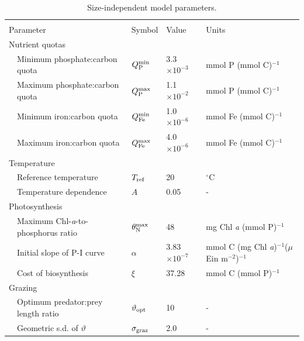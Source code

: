 \documentclass[gmd, manuscript]{copernicus}
\begin{document}
{\begin{table}[htp!]
\footnotesize
\caption{Size-independent model parameters.}
\begin{tabular*}{1.0\textwidth}{@{\extracolsep{\fill}}lllll}
\hline \\ [-2ex]
\multicolumn{2}{l}{{Parameter}} &{Symbol} & {Value} & {Units} \\ [+2ex]
\multicolumn{5}{l}{{Nutrient quotas}} \\ 
& Minimum phosphate:carbon quota & $Q^{\rm min}_{\rm P}$ & 3.3$\times10^{-3}$ & mmol P (mmol C)$^{-1}$ \\ 
& Maximum phosphate:carbon quota & $Q^{\rm max}_{\rm P}$ & 1.1$\times10^{-2}$ & mmol P (mmol C)$^{-1}$ \\ 
& Minimum iron:carbon quota & $Q^{\rm min}_{\rm Fe}$ & 1.0$\times10^{-6}$ & mmol Fe (mmol C)$^{-1}$ \\ 
& Maximum iron:carbon quota & $Q^{\rm max}_{\rm Fe}$ & 4.0$\times10^{-6}$ & mmol Fe (mmol C)$^{-1}$ \\ 
\multicolumn{5}{l}{{Temperature}} \\ 
& Reference temperature & $T_{\rm ref}$ & 20 & $^\circ$C \\ 
& Temperature dependence & $A$ & 0.05 & - \\ 
\multicolumn{5}{l}{{Photosynthesis}} \\ 
& Maximum Chl-\textit{a}-to-phosphorus ratio & $\theta^{\rm max}_{\rm N}$ & 48 & mg Chl \textit{a} (mmol P)$^{-1}$ \\ 
& Initial slope of P-I curve & $\alpha$ & 3.83$\times10^{-7}$ & mmol C (mg Chl \textit{a})$^{-1}$($\mu$Ein m$^{-2}$)$^{-1}$ \\ 
& Cost of biosynthesis & $\xi$ & 37.28 & mmol C (mmol P)$^{-1}$ \\ 
\multicolumn{5}{l}{{Grazing}}\\ 
& Optimum predator:prey length ratio & $\vartheta_{\rm opt}$ & 10 & - \\ 
& Geometric s.d. of $\vartheta$ & $\sigma_{\rm graz}$ & 2.0 & - \\ 

\end{tabular*}
\end{table}}
\end{document}
